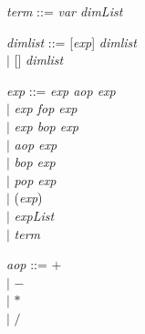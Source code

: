 \textit{term} ::= \textit{var dimList}\smallskip

\textit{dimlist} ::= \hspace{1.7em} [\textit{exp}] \textit{dimlist}\\
\hspace*{5.3em} $ | $ \hspace{0.4em} [\phantom{exp}] \textit{dimlist}\smallskip

\textit{exp} ::= \hspace{3.1em} \textit{exp aop exp}\\ %
\hspace*{5.3em} $ | $ \hspace{0.4em} \textit{exp fop exp}\\ %
\hspace*{5.3em} $ | $ \hspace{0.4em} \textit{exp bop exp}\\ %
\hspace*{5.3em} $ | $ \hspace{0.4em} \textit{aop exp}\\
\hspace*{5.3em} $ | $ \hspace{0.4em} \textit{bop exp}\\
\hspace*{5.3em} $ | $ \hspace{0.4em} \textit{pop exp}\\
\hspace*{5.3em} $ | $ \hspace{0.4em} (\textit{exp})\\
\hspace*{5.3em} $ | $ \hspace{0.4em} \textit{expList}\\
\hspace*{5.3em} $ | $ \hspace{0.4em} \textit{term}\smallskip

\textit{aop} ::= \hspace{3.1em} $+$ \\
\hspace*{5.3em} $ | $ \hspace{0.4em} $-$\\
\hspace*{5.3em} $ | $ \hspace{0.4em} $*$\\
\hspace*{5.3em} $ | $ \hspace{0.4em} $/$\smallskip

